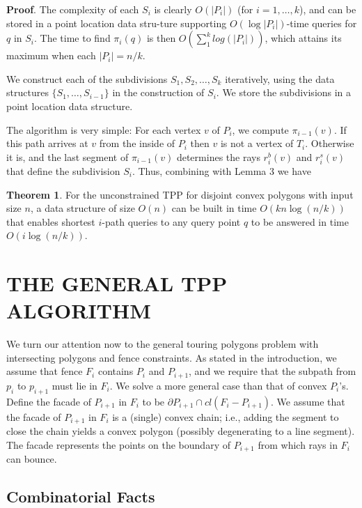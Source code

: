 \documentclass[a4paper]{article}
\begin{document}
\textbf{Proof}. The complexity of each \(S_i\) is clearly \(O(|P_i|)\) (for \(i = 1, \dots, k\)), and can be stored in a point location data stru-ture supporting \(O(\log |P_i|)\)-time queries for \(q\) in \(S_i\). The time to find \(\pi_i(q)\) is then \(O(\sum_{1}^{k} log(|P_i|))\), which attains its maximum when each \(|P_i| = n / k\).

We construct each of the subdivisions \(S_1, S_2, \dots, S_k\) iteratively, using the data structures \(\{S_1, \dots, S_{i-1}\}\) in the construction of \(S_i\). We store the subdivisions in a point location data structure.

The algorithm is very simple: For each vertex \(v\) of \(P_i\), we compute \(\pi_{i - 1}(v)\). If this path arrives at \(v\) from the inside of \(P_i\) then \(v\) is not a vertex of \(T_i\). Otherwise it is, and the last segment of \(\pi_{i - 1}(v)\) determines the rays \(r^b_i(v)\) and \(r^s_i(v)\) that define the subdivision \(S_i\). Thus, combining with Lemma 3 we have 

\textbf{Theorem 1}. For the unconstrained TPP for disjoint convex polygons with input size \(n\), a data structure of size \(O(n)\) can be built in time \(O(kn \log(n/k))\) that enables shortest \(i\)-path queries to any query point \(q\) to be answered in time \(O(i \log(n/k))\).

\section{THE GENERAL TPP ALGORITHM}

We turn our attention now to the general touring polygons problem with intersecting polygons and fence constraints. As stated in the introduction, we assume that fence \(F_i\) contains \(P_i\) and \(P_{i + 1}\), and we require that the subpath from \(p_i\) to \(p_{i+1}\) must lie in \(F_i\). We solve a more general case than that of convex \(P_i\)'s. Define the facade of \(P_{i + 1}\) in \(F_i\) to be \(\partial P_{i + 1} \cap c l (F_i - P_{i + 1})\). We assume that the facade of \(P_{i + 1}\) in \(F_i\) is a (single) convex chain; i.e., adding the segment to close the chain yields a convex polygon (possibly degenerating to a line segment). The facade represents the points on the boundary of \(P_{i + 1}\) from which rays in \(F_i\) can bounce.

\subsection{Combinatorial Facts}
\end{document}
